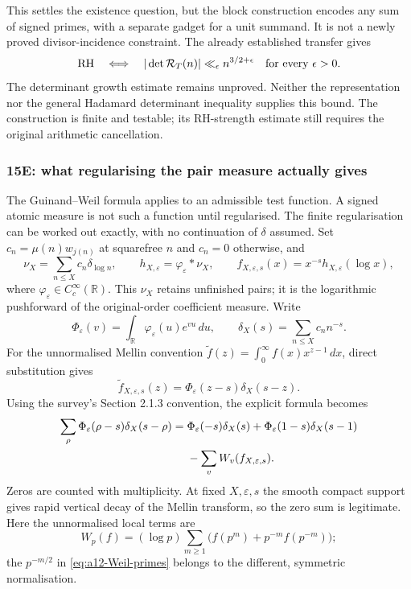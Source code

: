 This settles the existence question, but the block construction encodes
any sum of signed primes, with a separate gadget for a unit summand.
It is not a newly proved divisor-incidence constraint.
The already established transfer gives
\begin{equation}
\label{eq:a12-det-RH}
\mathrm{RH}\quad\Longleftrightarrow\quad
|\det\mathcal R_T(n)|\ll_\epsilon n^{3/2+\epsilon}
\quad\hbox{for every }\epsilon>0.
\end{equation}
The determinant growth estimate remains unproved.
Neither the representation nor the general Hadamard determinant
inequality supplies this bound. The construction is finite and testable;
its RH-strength estimate still requires the original arithmetic cancellation.

\subsubsection{15E: what regularising the pair measure actually gives}
\label{subsubsec:a12-GW}
The Guinand--Weil formula applies to an admissible test function.
A signed atomic measure is not such a function until regularised.
The finite regularisation can be worked out exactly, with no continuation
of $\delta$ assumed.
Set $c_n=\mu(n)w_{j(n)}$ at squarefree $n$ and $c_n=0$ otherwise, and
\begin{equation}
\label{eq:a12-GW-regularise}
\nu_X=\sum_{n\le X}c_n\delta_{\log n},\qquad
h_{X,\varepsilon}=\varphi_\varepsilon*\nu_X,\qquad
f_{X,\varepsilon,s}(x)=x^{-s}h_{X,\varepsilon}(\log x),
\end{equation}
where $\varphi_\varepsilon\in C_c^\infty(\mathbb R)$.
This $\nu_X$ retains unfinished pairs; it is the logarithmic pushforward
of the original-order coefficient measure. Write
\begin{equation}
\label{eq:a12-Phi-eps}
\Phi_\varepsilon(v)=\int_{\mathbb R}\varphi_\varepsilon(u)e^{vu}\,du,
\qquad \delta_X(s)=\sum_{n\le X}c_nn^{-s}.
\end{equation}
For the unnormalised Mellin convention
$\widetilde f(z)=\int_0^\infty f(x)x^{z-1}\,dx$, direct substitution gives
\begin{equation}
\label{eq:a12-GW-Mellin}
\widetilde f_{X,\varepsilon,s}(z)
=\Phi_\varepsilon(z-s)\delta_X(s-z).
\end{equation}
Using the survey's Section 2.1.3 convention, the explicit formula becomes
\begin{align}
\sum_\rho\Phi_\varepsilon(\rho-s)\delta_X(s-\rho)
={}&\Phi_\varepsilon(-s)\delta_X(s)
+\Phi_\varepsilon(1-s)\delta_X(s-1)\notag\\
&-\sum_v W_v(f_{X,\varepsilon,s}).
\label{eq:a12-GW-finite}
\end{align}
Zeros are counted with multiplicity. At fixed $X,\varepsilon,s$ the
smooth compact support gives rapid vertical decay of the Mellin
transform, so the zero sum is legitimate. Here the unnormalised local
terms are
\begin{equation}
\label{eq:a12-GW-local}
W_p(f)=(\log p)\sum_{m\ge1}
\bigl(f(p^m)+p^{-m}f(p^{-m})\bigr);
\end{equation}
the $p^{-m/2}$ in \eqref{eq:a12-Weil-primes} belongs to the different,
symmetric normalisation.

